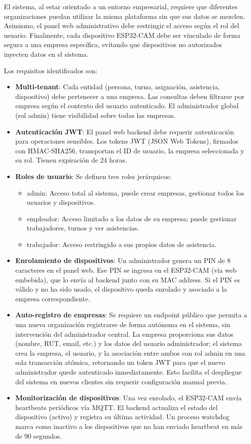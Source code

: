 El sistema, al estar orientado a un entorno empresarial, requiere que diferentes organizaciones puedan utilizar la misma plataforma sin que sus datos se mezclen. Asimismo, el panel web administrativo debe restringir el acceso según el rol del usuario. Finalmente, cada dispositivo ESP32-CAM debe ser vinculado de forma segura a una empresa específica, evitando que dispositivos no autorizados inyecten datos en el sistema.

Los requisitos identificados son:

\begin{itemize}
    \item \textbf{Multi-tenant}: Cada entidad (persona, turno, asignación, asistencia, dispositivo) debe pertenecer a una empresa. Las consultas deben filtrarse por empresa según el contexto del usuario autenticado. El administrador global (rol admin) tiene visibilidad sobre todas las empresas.
    \item \textbf{Autenticación JWT}: El panel web backend debe requerir autenticación para operaciones sensibles. Los tokens JWT (JSON Web Tokens), firmados con HMAC-SHA256, transportan el ID de usuario, la empresa seleccionada y su rol. Tienen expiración de 24 horas.
    \item \textbf{Roles de usuario}: Se definen tres roles jerárquicos:
    \begin{itemize}
        \item admin: Acceso total al sistema, puede crear empresas, gestionar todos los usuarios y dispositivos.
        \item empleador: Acceso limitado a los datos de su empresa; puede gestionar trabajadores, turnos y ver asistencias.
        \item trabajador: Acceso restringido a sus propios datos de asistencia.
    \end{itemize}
    \item \textbf{Enrolamiento de dispositivos}: Un administrador genera un PIN de 8 caracteres en el panel web. Ese PIN se ingresa en el ESP32-CAM (vía web embebida), que lo envía al backend junto con su MAC address. Si el PIN es válido y no ha sido usado, el dispositivo queda enrolado y asociado a la empresa correspondiente.
    \item \textbf{Auto-registro de empresas}: Se requiere un endpoint público que permita a una nueva organización registrarse de forma autónoma en el sistema, sin intervención del administrador central. La empresa proporciona sus datos (nombre, RUT, email, etc.) y los datos del usuario administrador; el sistema crea la empresa, el usuario, y la asociación entre ambos con rol admin en una sola transacción atómica, retornando un token JWT para que el nuevo administrador quede autenticado inmediatamente. Esto facilita el despliegue del sistema en nuevos clientes sin requerir configuración manual previa.
    \item \textbf{Monitorización de dispositivos}: Una vez enrolado, el ESP32-CAM envía heartbeats periódicos vía MQTT. El backend actualiza el estado del dispositivo (activo) y registra su última actividad. Un proceso watchdog marca como inactivo a los dispositivos que no han enviado heartbeat en más de 90 segundos.
\end{itemize}

